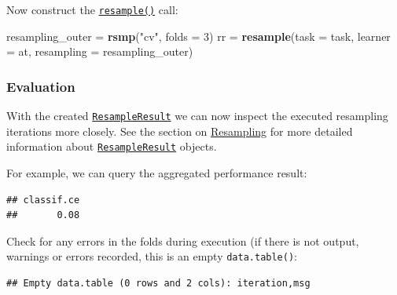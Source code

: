 \documentclass[]{article}
\newenvironment{Shaded}{\begin{snugshade}}{\end{snugshade}}
\newcommand{\DataTypeTok}[1]{\textcolor[rgb]{0.13,0.29,0.53}{#1}}
\newcommand{\DecValTok}[1]{\textcolor[rgb]{0.00,0.00,0.81}{#1}}
\newcommand{\KeywordTok}[1]{\textcolor[rgb]{0.13,0.29,0.53}{\textbf{#1}}}
\newcommand{\NormalTok}[1]{#1}
\newcommand{\OperatorTok}[1]{\textcolor[rgb]{0.81,0.36,0.00}{\textbf{#1}}}
\newcommand{\StringTok}[1]{\textcolor[rgb]{0.31,0.60,0.02}{#1}}
\renewenvironment{Shaded} {\begin{snugshade}\small} {\end{snugshade}}
\begin{document}
Now construct the \href{https://mlr3.mlr-org.com/reference/resample.html}{\texttt{resample()}} call:

\begin{Shaded}
\begin{Highlighting}[]
\NormalTok{resampling_outer =}\StringTok{ }\KeywordTok{rsmp}\NormalTok{(}\StringTok{"cv"}\NormalTok{, }\DataTypeTok{folds =} \DecValTok{3}\NormalTok{)}
\NormalTok{rr =}\StringTok{ }\KeywordTok{resample}\NormalTok{(}\DataTypeTok{task =}\NormalTok{ task, }\DataTypeTok{learner =}\NormalTok{ at, }\DataTypeTok{resampling =}\NormalTok{ resampling_outer)}
\end{Highlighting}
\end{Shaded}

\hypertarget{nested-resamp-eval}{%
\subsubsection{Evaluation}\label{nested-resamp-eval}}

With the created \href{https://mlr3.mlr-org.com/reference/ResampleResult.html}{\texttt{ResampleResult}} we can now inspect the executed resampling iterations more closely.
See the section on \protect\hyperlink{resampling}{Resampling} for more detailed information about \href{https://mlr3.mlr-org.com/reference/ResampleResult.html}{\texttt{ResampleResult}} objects.

For example, we can query the aggregated performance result:

\begin{Shaded}
\end{Shaded}

\begin{verbatim}
## classif.ce 
##       0.08
\end{verbatim}

Check for any errors in the folds during execution (if there is not output, warnings or errors recorded, this is an empty \texttt{data.table()}:

\begin{Shaded}
\end{Shaded}

\begin{verbatim}
## Empty data.table (0 rows and 2 cols): iteration,msg
\end{verbatim}
\end{document}
